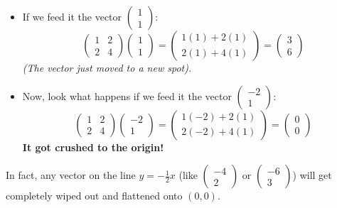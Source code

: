 \documentclass{article}
\begin{document}
\begin{itemize}
    \item If we feed it the vector $\begin{pmatrix} 1 \\ 1 \end{pmatrix}$:
    \[ \begin{pmatrix} 1 & 2 \\ 2 & 4 \end{pmatrix} \begin{pmatrix} 1 \\ 1 \end{pmatrix} = \begin{pmatrix} 1(1) + 2(1) \\ 2(1) + 4(1) \end{pmatrix} = \begin{pmatrix} 3 \\ 6 \end{pmatrix} \]
    \textit{(The vector just moved to a new spot).}
    
    \item Now, look what happens if we feed it the vector $\begin{pmatrix} -2 \\ 1 \end{pmatrix}$:
    \[ \begin{pmatrix} 1 & 2 \\ 2 & 4 \end{pmatrix} \begin{pmatrix} -2 \\ 1 \end{pmatrix} = \begin{pmatrix} 1(-2) + 2(1) \\ 2(-2) + 4(1) \end{pmatrix} = \begin{pmatrix} 0 \\ 0 \end{pmatrix} \]
    \textbf{It got crushed to the origin!}
\end{itemize}

In fact, any vector on the line $y = -\frac{1}{2}x$ (like $\begin{pmatrix} -4 \\ 2 \end{pmatrix}$ or $\begin{pmatrix} -6 \\ 3 \end{pmatrix}$) will get completely wiped out and flattened onto $(0,0)$. 
\end{document}
